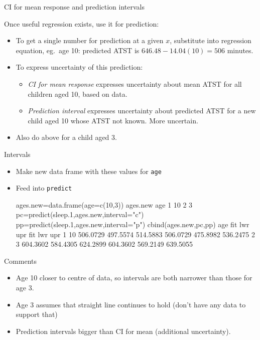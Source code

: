 
\begin{frame}{CI for mean response and prediction intervals}

Once useful regression exists, use it for prediction:


\begin{itemize}
\item To get a single number for prediction at a given $x$, substitute into regression equation, eg.\ age 10: predicted ATST is $646.48-14.04(10)=506$ minutes.
\item To express uncertainty of this prediction:
  \begin{itemize}
  \item {\em CI for mean response} expresses uncertainty about mean ATST for all children aged 10, based on data.
  \item {\em Prediction interval} expresses uncertainty about predicted ATST for a new child aged 10 whose ATST not known. More uncertain.
  \end{itemize}
\item Also do above for a child aged 3.
\end{itemize}
\end{frame}
\begin{frame}[fragile]{Intervals}
\begin{itemize}
\item Make new data frame with these values for \texttt{age}
\item Feed into \texttt{predict}
{\scriptsize
\begin{semiverbatim}
ages.new=data.frame(age=c(10,3))
ages.new
  age
1  10
2   3
pc=predict(sleep.1,ages.new,interval="c")
pp=predict(sleep.1,ages.new,interval="p")
cbind(ages.new,pc,pp)
  age      fit      lwr      upr      fit      lwr      upr
1  10 506.0729 497.5574 514.5883 506.0729 475.8982 536.2475
2   3 604.3602 584.4305 624.2899 604.3602 569.2149 639.5055  
\end{semiverbatim}
}
\end{itemize}

\end{frame}

\begin{frame}[fragile]{Comments}

\begin{itemize}
\item Age 10 closer to centre of data, so intervals are both narrower than those for age 3.
\item Age 3 assumes that straight line continues to hold (don't have any data to support that)
\item Prediction intervals bigger than CI for mean (additional uncertainty).
\end{itemize}

\end{frame}


